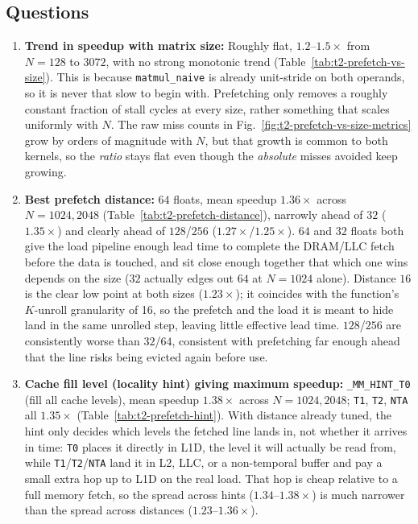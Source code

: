 \documentclass[11pt]{article}
\begin{document}
\subsection{Questions}
\begin{enumerate}[leftmargin=1.6em, itemsep=0.4em]
    \item \textbf{Trend in speedup with matrix size:} Roughly flat, $1.2$--$1.5\times$
    from $N=128$ to $3072$, with no strong monotonic trend (Table~\ref{tab:t2-prefetch-vs-size}).
    This is because \texttt{matmul\_naive} is already unit-stride on both
    operands, so it is never
    that slow to begin with. Prefetching only removes a roughly
    constant fraction of stall cycles at every size, rather something
    that scales uniformly with $N$. The raw miss counts in
    Fig.~\ref{fig:t2-prefetch-vs-size-metrics} grow by orders of magnitude
    with $N$, but that growth is common to both kernels, so the \emph{ratio}
    stays flat even though the \emph{absolute} misses avoided keep growing.

    \item \textbf{Best prefetch distance:} $64$ floats, mean speedup $1.36\times$
    across $N{=}1024,2048$ (Table~\ref{tab:t2-prefetch-distance}), narrowly
    ahead of $32$ ($1.35\times$) and clearly ahead of $128$/$256$ ($1.27\times$/$1.25\times$).
    $64$ and $32$ floats both give the load pipeline enough lead time to
    complete the DRAM/LLC fetch before the data is touched, and sit close
    enough together that which one wins depends on the size ($32$ actually
    edges out $64$ at $N{=}1024$ alone). Distance $16$ is the clear low point
    at both sizes ($1.23\times$); it coincides with the function's $K$-unroll
    granularity of 16, so the prefetch and the load it is meant to hide land
    in the same unrolled step, leaving little effective lead time. $128$/$256$
    are consistently worse than $32$/$64$, consistent with prefetching far
    enough ahead that the line risks being evicted again before use.

    \item \textbf{Cache fill level (locality hint) giving maximum speedup:}
    \texttt{\_MM\_HINT\_T0} (fill all cache levels), mean speedup $1.38\times$
    across $N{=}1024,2048$; \texttt{T1}, \texttt{T2}, \texttt{NTA} all $1.35\times$
    (Table~\ref{tab:t2-prefetch-hint}). With distance already tuned, the hint
    only decides which levels the fetched line lands in, not whether it
    arrives in time: \texttt{T0} places it directly in L1D, the level it will
    actually be read from, while \texttt{T1}/\texttt{T2}/\texttt{NTA} land it
    in L2, LLC, or a non-temporal buffer and pay a small extra hop up to L1D
    on the real load. That hop is cheap relative to a full memory fetch, so
    the spread across hints ($1.34$--$1.38\times$) is much narrower than the
    spread across distances ($1.23$--$1.36\times$).


\end{enumerate}
\end{document}
